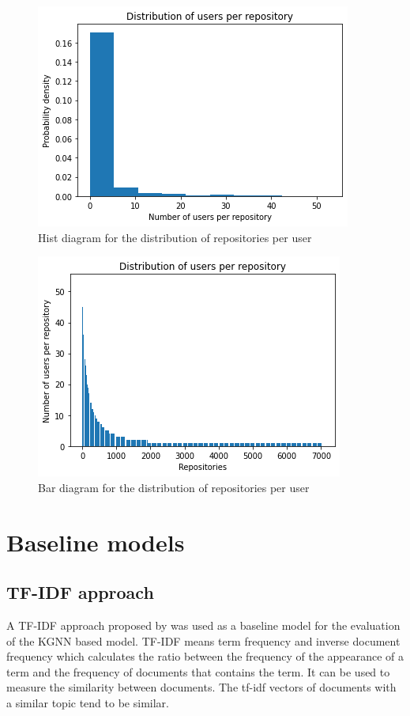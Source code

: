 \documentclass[11pt,twoside]{report}
\begin{document}
\begin{figure}[H]
    \centering
    \includegraphics[scale=0.9]{user_repo_dist_hist.png}
    \caption{Hist diagram for the distribution of repositories per user}
    \label{fig:user_repo_dist_hist}
\end{figure}

\begin{figure}[H]
    \centering
    \includegraphics[scale=0.9]{user_repo_dist_bar.png}
    \caption{Bar diagram for the distribution of repositories per user}
    \label{fig:user_repo_dist_bar}
\end{figure}

\section{Baseline models}
\subsection{TF-IDF approach}
A TF-IDF approach proposed by \cite{sun_personalized_2018} was used as a baseline model for the evaluation of the KGNN based model. TF-IDF means term frequency and inverse document frequency which calculates the ratio between the frequency of the appearance of a term and the frequency of documents that contains the term. It can be used to measure the similarity between documents. The tf-idf vectors of documents with a similar topic tend to be similar.
\end{document}
